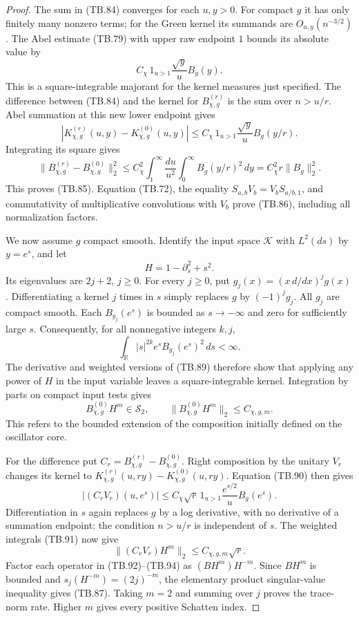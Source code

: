 \begin{proof}
The sum in (TB.84) converges for each \(u,y>0\).
For compact \(g\) it has only finitely many nonzero terms;
for the Green kernel its summands are \(O_{u,y}(n^{-3/2})\).
The Abel estimate (TB.79) with upper raw endpoint \(1\)
bounds its absolute value by
\[
       C_\chi\,1_{u>1}\frac{\sqrt y}{u}B_g(y).
 \tag{TB.89}
\]
This is a square-integrable majorant for the kernel
measures just specified.
The difference between (TB.84) and the kernel for
\(B_{\chi,g}^{(r)}\) is the sum over \(n>u/r\).
Abel summation at this new lower endpoint gives
\[
 |K_{\chi,g}^{(r)}(u,y)-K_{\chi,g}^{(0)}(u,y)|
       \leq C_\chi\,1_{u>1}\frac{\sqrt y}{u}B_g(y/r).
 \tag{TB.90}
\]
Integrating its square gives
\[
 \|B_{\chi,g}^{(r)}-B_{\chi,g}^{(0)}\|_2^2
 \leq C_\chi^2
       \int_1^\infty\frac{du}{u^2}
       \int_0^\infty B_g(y/r)^2\,dy
 =C_\chi^2r\|B_g\|_2^2 .
 \]
This proves (TB.85).
Equation (TB.72), the equality
\(S_{a,b}V_b=V_bS_{a/b,1}\), and commutativity of
multiplicative convolutions with \(V_b\) prove
(TB.86), including all normalization factors.

We now assume \(g\) compact smooth.
Identify the input space \(\mathcal K\) with \(L^2(ds)\)
by \(y=e^s\), and let
\[
                         H=1-\partial_s^2+s^2 .
 \]
Its eigenvalues are \(2j+2\), \(j\geq0\).
For every \(j\geq0\), put
\(g_j(x)=(x\,d/dx)^jg(x)\).
Differentiating a kernel \(j\) times in \(s\) simply
replaces \(g\) by \((-1)^jg_j\).
All \(g_j\) are compact smooth.
Each \(B_{g_j}(e^s)\) is bounded as \(s\to-\infty\)
and zero for sufficiently large \(s\).
Consequently, for all nonnegative integers \(k,j\),
\[
 \int_{\mathbb R}
      |s|^{2k}e^s B_{g_j}(e^s)^2\,ds<\infty.
 \tag{TB.91}
\]
The derivative and weighted versions of (TB.89)
therefore show that applying any power of \(H\) in the
input variable leaves a square-integrable kernel.
Integration by parts on compact input tests gives
\[
             B_{\chi,g}^{(0)}H^m\in\mathcal S_2,\qquad
             \|B_{\chi,g}^{(0)}H^m\|_2\leq C_{\chi,g,m}.
 \tag{TB.92}
\]
This refers to the bounded extension of the composition
initially defined on the oscillator core.

For the difference put
\(C_r=B_{\chi,g}^{(r)}-B_{\chi,g}^{(0)}\).
Right composition by the unitary \(V_r\) changes its
kernel to \(K_{\chi,g}^{(r)}(u,ry)-K_{\chi,g}^{(0)}(u,ry)\).
Equation (TB.90) then gives
\[
 |(C_rV_r)(u,e^s)|
       \leq C_\chi\sqrt r\,1_{u>1}
                           \frac{e^{s/2}}u B_g(e^s).
 \tag{TB.93}
\]
Differentiation in \(s\) again replaces \(g\) by a log
derivative, with no derivative of a summation endpoint:
the condition \(n>u/r\) is independent of \(s\).
The weighted integrals (TB.91) now give
\[
                      \|(C_rV_r)H^m\|_2
                            \leq C_{\chi,g,m}\sqrt r.
 \tag{TB.94}
\]
Factor each operator in (TB.92)--(TB.94) as
\((BH^m)H^{-m}\).
Since \(BH^m\) is bounded and
\(s_j(H^{-m})=(2j)^{-m}\), the elementary product
singular-value inequality gives (TB.87).
Taking \(m=2\) and summing over \(j\) proves the trace-norm
rate.  Higher \(m\) gives every positive Schatten index.


\end{proof}

